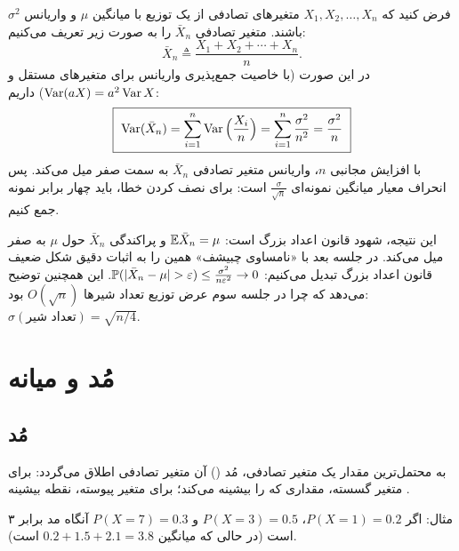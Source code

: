 فرض کنید که $X_1,X_2,\ldots,X_n$ متغیرهای تصادفی  از یک توزیع با میانگین $\mu$ و واریانس $\sigma^2$ باشند. متغیر تصادفی $\bar X_n$ را به صورت زیر تعریف می‌کنیم:
\[
\bar X_n\triangleq\frac{X_1+X_2+\cdots+X_n}{n}.
\]
در این صورت (با خاصیت جمع‌پذیری واریانس برای متغیرهای مستقل و $\operatorname{Var}(aX)=a^2\operatorname{Var} X$) داریم:
\[
\boxed{\ \Var(\bar X_n)=\sum_{i=1}^{n}\Var\Big(\frac{X_i}{n}\Big)=\sum_{i=1}^{n}\frac{\sigma^2}{n^2}=\frac{\sigma^2}{n}\ }
\]
با افزایش مجانبی $n$، واریانس متغیر تصادفی $\bar X_n$ به سمت صفر میل می‌کند. پس انحراف معیار میانگین نمونه‌ای $\frac{\sigma}{\sqrt n}$ است: برای نصف کردن خطا، باید چهار برابر نمونه جمع کنیم.

\begin{note}
\notetitle این نتیجه، شهود قانون اعداد بزرگ است: $\mathbb{E}\bar X_n=\mu$ و پراکندگی $\bar X_n$ حول $\mu$ به صفر میل می‌کند. در جلسه بعد با «نامساوی چبیشف» همین را به اثبات دقیق شکل ضعیف قانون اعداد بزرگ تبدیل می‌کنیم:
$\Prob(|\bar X_n-\mu|>\varepsilon)\le\frac{\sigma^2}{n\varepsilon^2}\to0$. این همچنین توضیح می‌دهد که چرا در جلسه سوم عرض توزیع تعداد شیرها $O(\sqrt n)$ بود: $\sigma(\text{تعداد شیر})=\sqrt{n/4}$.
\end{note}

\section{مُد و میانه }

\subsection{مُد }
\begin{definition}[مد]
به \textcolor{red!70!black}{محتمل‌ترین} مقدار یک متغیر تصادفی، مُد () آن متغیر تصادفی اطلاق می‌گردد: برای متغیر گسسته، مقداری که  را بیشینه می‌کند؛ برای متغیر پیوسته، نقطه بیشینه .
\end{definition}
مثال: اگر $P(X=1)=0.2$، $P(X=3)=0.5$ و $P(X=7)=0.3$ آنگاه مد برابر ۳ است (در حالی که میانگین $0.2+1.5+2.1=3.8$ است).

